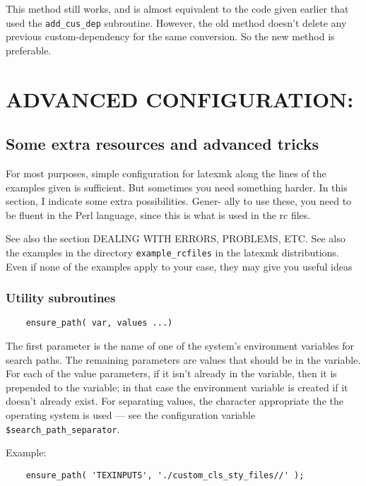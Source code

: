 This method still works, and is almost equivalent  to  the  code  given
earlier  that used the \verb|add_cus_dep| subroutine.  However, the old method
doesn't delete any previous custom-dependency for the same  conversion.
So the new method is preferable.

\section{ADVANCED CONFIGURATION:}

\subsection{Some extra resources and advanced tricks}

For  most purposes, simple configuration for latexmk along the lines of
the examples given is sufficient.  But  sometimes  you  need  something
harder.   In this section, I indicate some extra possibilities.  Gener-
ally to use these, you need to be fluent in the  Perl  language,  since
this is what is used in the rc files.

See  also the section DEALING WITH ERRORS, PROBLEMS, ETC.  See also the
examples in the directory \verb|example_rcfiles| in the latexmk distributions.
Even if none of the examples apply to your case, they may give you useful ideas

\subsubsection{Utility subroutines}

\begin{verbatim}
	ensure_path( var, values ...)
\end{verbatim}

The first parameter is the name of one of the system's  environment  variables
for search paths.  The remaining parameters are values that should be in the
variable.  For each  of  the  value parameters,  if  it  isn't  already  in the
variable, then it is prepended to the variable; in that case the environment
variable is  created  if it doesn't already exist. For separating values, the
character appropriate the the operating system  is  used  --- see the
configuration variable \verb|$search_path_separator|.

Example:

\begin{verbatim}
	ensure_path( 'TEXINPUTS', './custom_cls_sty_files//' );
\end{verbatim}

